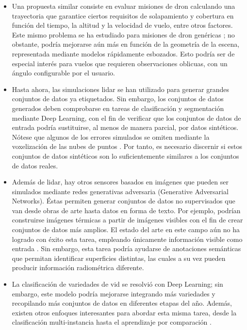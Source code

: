 \begin{itemize}
    \item Una propuesta similar consiste en evaluar misiones de dron calculando una trayectoria que garantice ciertos requisitos de solapamiento y cobertura en función del tiempo, la altitud y la velocidad de vuelo, entre otros factores. Este mismo problema se ha estudiado para misiones de dron genéricas \cite{pessacg_simplifying_2022}; no obstante, podría mejorarse aún más en función de la geometría de la escena, representada mediante modelos rápidamente esbozados. Esto podría ser de especial interés para vuelos que requieren observaciones oblicuas, con un ángulo configurable por el usuario. 
    \item Hasta ahora, las simulaciones \acrshort{lidar} se han utilizado para generar grandes conjuntos de datos ya etiquetados. Sin embargo, los conjuntos de datos generados deben comprobarse en tareas de clasificación y segmentación mediante Deep Learning, con el fin de verificar que los conjuntos de datos de entrada podría sustituirse, al menos de manera parcial, por datos sintéticos. Nótese que algunos de los errores simulados se omiten mediante la voxelización de las nubes de puntos \cite{hackel_semantic3d_2017, behley_towards_2021}. Por tanto, es necesario discernir si estos conjuntos de datos sintéticos son lo suficientemente similares a los conjuntos de datos reales. 
    \item Además de \acrshort{lidar}, hay otros sensores basados en imágenes que pueden ser simulados mediante redes generativas adversaria (Generative Adversarial Networks). Éstas permiten generar conjuntos de datos no supervisados que van desde obras de arte hasta datos en forma de texto. Por ejemplo, podrían construirse imágenes térmicas a partir de imágenes visibles con el fin de crear conjuntos de datos más amplios. El estado del arte en este campo aún no ha logrado con éxito esta tarea, empleando únicamente información visible como entrada \cite{li_multi-branch_2019, li_i-gans_2021, kniaz_thermalgan_2019, ozkanoglu_infragan_2022, yi_cycle_2023}. Sin embargo, esta tarea podría ayudarse de anotaciones semánticas que permitan identificar superficies distintas, las cuales a su vez pueden producir información radiométrica diferente.
    \item La clasificación de variedades de vid se resolvió con Deep Learning; sin embargo, este modelo podría mejorarse integrando más variedades y recopilando más conjuntos de datos en diferentes etapas del año. Además, existen otros enfoques interesantes para abordar esta misma tarea, desde la clasificación multi-instancia \cite{meerdink_multitarget_2022} hasta el aprendizaje por comparación \cite{guan_spatial-spectral_2022}. 
\end{itemize}

